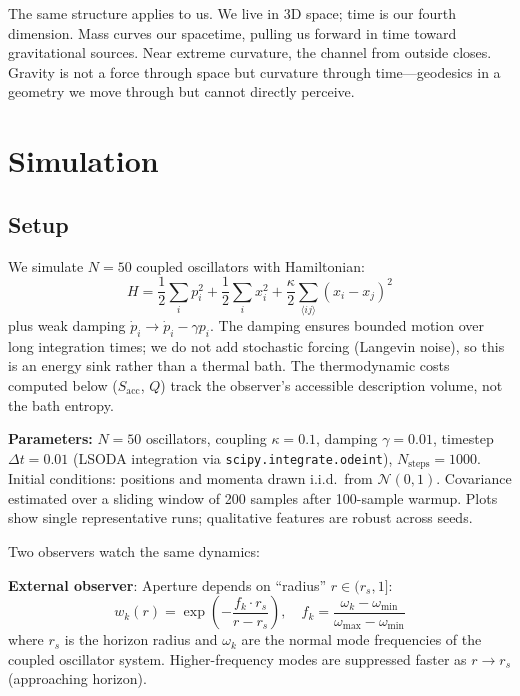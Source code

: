 \documentclass[11pt,a4paper]{article}
\begin{document}
The same structure applies to us. We live in 3D space; time is our fourth dimension. Mass curves our spacetime, pulling us forward in time toward gravitational sources. Near extreme curvature, the channel from outside closes. Gravity is not a force through space but curvature through time---geodesics in a geometry we move through but cannot directly perceive.

\section{Simulation}

\subsection{Setup}

We simulate $N = 50$ coupled oscillators with Hamiltonian:
\begin{equation}
    H = \frac{1}{2}\sum_i p_i^2 + \frac{1}{2}\sum_i x_i^2 + \frac{\kappa}{2}\sum_{\langle ij \rangle}(x_i - x_j)^2
\end{equation}
plus weak damping $\dot{p}_i \to \dot{p}_i - \gamma p_i$. The damping ensures bounded motion over long integration times; we do not add stochastic forcing (Langevin noise), so this is an energy sink rather than a thermal bath. The thermodynamic costs computed below ($S_{\mathrm{acc}}$, $Q$) track the observer's accessible description volume, not the bath entropy.

\textbf{Parameters:} $N=50$ oscillators, coupling $\kappa=0.1$, damping $\gamma=0.01$, timestep $\Delta t = 0.01$ (LSODA integration via \texttt{scipy.integrate.odeint}), $N_{\mathrm{steps}}=1000$. Initial conditions: positions and momenta drawn i.i.d.\ from $\mathcal{N}(0,1)$. Covariance estimated over a sliding window of 200 samples after 100-sample warmup. Plots show single representative runs; qualitative features are robust across seeds.

Two observers watch the same dynamics:

\textbf{External observer}: Aperture depends on ``radius'' $r \in (r_s, 1]$:
\begin{equation}
    w_k(r) = \exp\left(-\frac{f_k \cdot r_s}{r - r_s}\right), \quad f_k = \frac{\omega_k - \omega_{\min}}{\omega_{\max} - \omega_{\min}}
\end{equation}
where $r_s$ is the horizon radius and $\omega_k$ are the normal mode frequencies of the coupled oscillator system. Higher-frequency modes are suppressed faster as $r \to r_s$ (approaching horizon).
\end{document}

